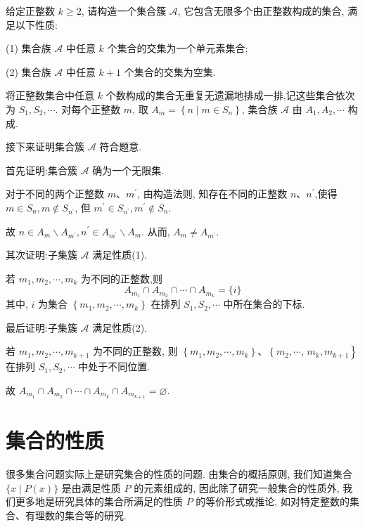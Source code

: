 \begin{example}
	给定正整数 $k \geqslant 2$, 请构造一个集合簇 $\mathscr{A}$, 它包含无限多个由正整数构成的集合, 满足以下性质:

	(1) 集合族 $\mathscr{A}$ 中任意 $k$ 个集合的交集为一个单元素集合;

	(2) 集合族 $\mathscr{A}$ 中任意 $k+1$ 个集合的交集为空集.
\end{example}
\begin{solution}
	将正整数集合中任意 $k$ 个数构成的集合无重复无遗漏地排成一排,记这些集合依次为 $S_{1}, S_{2}, \cdots$. 对每个正整数 $m$, 取 $A_{m}=\left\{n \mid m \in S_{n}\right\}$, 集合族 $\mathscr{A}$ 由 $A_{1}, A_{2}, \cdots$ 构成.

	接下来证明集合簇 $\mathscr{A}$ 符合题意.

	首先证明:集合簇 $\mathscr{A}$ 确为一个无限集.

	对于不同的两个正整数 $m 、 m^{\prime}$, 由构造法则, 知存在不同的正整数 $n 、 n^{\prime}$,使得 $m \in S_{n}, m \notin S_{n^{\prime}}$, 但 $m^{\prime} \in S_{n^{\prime}}, m^{\prime} \notin S_{n}$.

	故 $n \in A_{m} \backslash A_{m^{\prime}}, n^{\prime} \in A_{m^{\prime}} \backslash A_{m}$. 从而, $A_{m} \neq A_{m^{\prime}}$.

	其次证明:子集簇  $\mathscr{A}$ 满足性质(1).

	若 $m_{1}, m_{2}, \cdots, m_{k}$ 为不同的正整数,则
	$$
		A_{m_{1}} \cap A_{m_{2}} \cap \cdots \cap A_{m_{k}}=\{i\}
	$$
	其中, $i$ 为集合 $\left\{m_{1}, m_{2}, \cdots, m_{k}\right\}$ 在排列 $S_{1}, S_{2}, \cdots$ 中所在集合的下标.

	最后证明:子集簇 $\mathscr{A}$ 满足性质(2).

	若 $m_{1}, m_{2}, \cdots, m_{k+1}$ 为不同的正整数, 则 $\left\{m_{1}, m_{2}, \cdots, m_{k}\right\} 、\left\{m_{2}, \cdots\right.$, $\left.m_{k}, m_{k+1}\right\}$ 在排列 $S_{1}, S_{2}, \cdots$ 中处于不同位置.

	故 $A_{m_{1}} \cap A_{m_{2}} \cap \cdots \cap A_{m_{k}} \cap A_{m_{k+1}}=\varnothing$.
\end{solution}

\section{集合的性质}
很多集合问题实际上是研究集合的性质的问题. 由集合的概括原则, 我们知道集合 $\{x \mid P(x)\}$ 是由满足性质 $P$ 的元素组成的, 因此除了研究一般集合的性质外, 我们更多地是研究具体的集合所满足的性质 $P$ 的等价形式或推论, 如对特定整数的集合、有理数的集合等的研究.

